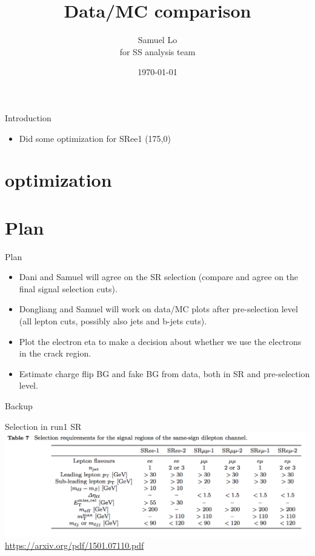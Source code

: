 \documentclass[mathserif,serif]{beamer}
\title[]{Data/MC comparison}
\author[]
{
Samuel Lo \inst{1} \\
for SS analysis team
}
\institute[]
{
\inst{1}
The University of Hong Kong
}
\date[]{\today}
\begin{document}
\frame{\titlepage}

\begin{frame}{Introduction}
\begin{itemize}
\item Did some optimization for SRee1 (175,0)
\end{itemize}
\end{frame}

\section{optimization}

\section{Plan}
\begin{frame}{Plan}
\begin{itemize}
\item Dani and Samuel will agree on the SR selection (compare and agree on the final signal selection cuts).
\item Dongliang and Samuel will work on data/MC plots after pre-selection level (all lepton cuts, possibly also jets and b-jets cuts).
\item Plot the electron eta to make a decision about whether we use the electrons in the crack region.
\item Estimate charge flip BG and fake BG from data, both in SR and pre-selection level.
\end{itemize}
\end{frame}

\begin{frame}
\begin{center}
\huge
Backup
\end{center}
\end{frame}

\begin{frame}{Selection in run1 SR}
\includegraphics[width=\textwidth]{data/photo/SRcutrun1.png} \\
\url{https://arxiv.org/pdf/1501.07110.pdf}
\end{frame}
\end{document}
